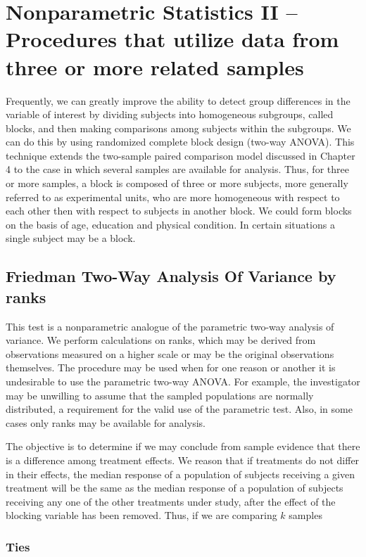 \chapter{Nonparametric Statistics II -- Procedures that utilize data from three or more related samples}

Frequently, we can greatly improve the ability to detect group differences in the variable of
interest by dividing subjects into homogeneous subgroups, called blocks, and then making
comparisons among subjects within the subgroups. We can do this by using randomized complete
block design (two-way ANOVA). This technique extends the two-sample paired comparison model
discussed in Chapter 4 to the case in which several samples are available for analysis. Thus, for
three or more samples, a block is composed of three or more subjects, more generally referred to as
experimental units, who are more homogeneous with respect to each other then with respect to
subjects in another block. We could form blocks on the basis of age, education and physical
condition. In certain situations a single subject may be a block.

\section{Friedman Two-Way Analysis Of Variance by ranks}

This test is a nonparametric analogue of the parametric two-way analysis of variance. We
perform calculations on ranks, which may be derived from observations measured on a higher scale
or may be the original observations themselves. The procedure may be used when for one reason or
another it is undesirable to use the parametric two-way ANOVA. For example, the investigator may
be unwilling to assume that the sampled populations are normally distributed, a requirement for the
valid use of the parametric test. Also, in some cases only ranks may be available for analysis.

The objective is to determine if we may conclude from sample evidence that there is a
difference among treatment effects. We reason that if treatments do not differ in their effects, the
median response of a population of subjects receiving a given treatment will be the same as the
median response of a population of subjects receiving any one of the other treatments under study,
after the effect of the blocking variable has been removed. Thus, if we are comparing $k$ samples

\subsection{Ties}

